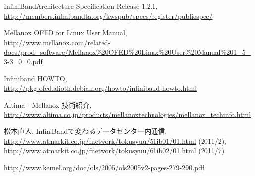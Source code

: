 \documentclass[mingoth,a4paper]{jsarticle}
\begin{document}
\begin{thebibliography}{0}
 InfiniBandArchitecture Specification Release 1.2.1, \\
\url{http://members.infinibandta.org/kwspub/specs/register/publicspec/}

 Mellanox OFED for Linux User Manual, \\
\url{http://www.mellanox.com/related-docs/prod\_software/Mellanox%20OFED%20Linux%20User%20Manual%201\_5\_3-3\_0\_0.pdf}

 Infiniband HOWTO, \\
\url{http://pkg-ofed.alioth.debian.org/howto/infiniband-howto.html}

 Altima - Mellanox 技術紹介, \\
\url{http://www.altima.co.jp/products/mellanoxtechnologies/mellanox\_techinfo.html}

 松本直人, InfiniBandで変わるデータセンター内通信, \\
\url{http://www.atmarkit.co.jp/fnetwork/tokusyuu/51ib01/01.html} (2011/2), \\
\url{http://www.atmarkit.co.jp/fnetwork/tokusyuu/61ib02/01.html} (2011/7)


\url{http://www.kernel.org/doc/ols/2005/ols2005v2-pages-279-290.pdf}






\end{thebibliography}
\end{document}
